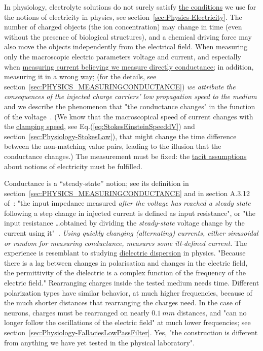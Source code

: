 In physiology, electrolyte solutions do not surely satisfy 
\hyperlink{electric_resistance}{the conditions}
we use for the notions of electricity in physics, see section~\ref{sec:Physics-Electricity}.
The number of charged objects (the ion concentration) may change in
time (even without the presence of biological structures), and a chemical driving force may also move the objects independently
from the electrical field. When measuring only the macroscopic electric
parameters voltage and current, and especially when 
\hyperlink{electric_conductance}
{measuring current believing we measure
directly conductance;} in addition, measuring it in a wrong way; (for the details, see section~\ref{sec:PHYSICS_MEASURINGCONDUCTANCE}) \emph{we
attribute the consequences of the injected charge carriers' low propagation speed to the
medium} and we describe the phenomenon that "the conductance changes"
in the function of the voltage~\cite{KochVoltageDependentConductance:1999}.
(We know that the macroscopical speed of current changes with the \hyperlink{voltage-clamping}{clamping speed}, see Eq.(\ref{eq:StokesEinsteinSpeeddV}) and section~\ref{sec:Physiology-StokesLaw}),
that might change the time difference between the non-matching value pairs, leading to the illusion that the conductance changes.)
The measurement must be fixed:  the 
\hyperlink{electric_resistance}
{tacit assumptions} about notions of electricity must be fulfilled. 



Conductance is a ``steady-state''
notion; see its definition in section~\ref{sec:PHYSICS_MEASURINGCONDUCTANCE} and in section A.3.12 of~\cite{JohnstonWuNeurophysiology:1995}:
"the input impedance measured \emph{after the voltage has reached
	a steady state} following a step change in injected current is defined
as input resistance", or "the input resistance \dots obtained
by dividing the \emph{steady-state} voltage change by the current
using it"~\cite{KochBiophysics:1999}.  \textit{Using quickly changing (alternating) currents, either sinusoidal or random  for measuring conductance, measures some ill-defined current.}
The experience is resemblant to studying \href{https://en.wikipedia.org/wiki/Dielectric}
{dielectric dispersion} in physics. 
"Because there is a lag between changes in polarisation and changes in the electric field, the permittivity of the dielectric is a complex function of the frequency of the electric field." 
Rearranging charges inside the tested medium needs time. 
Different polarization types have similar behavior, at much higher frequencies, because of the much shorter distances that rearranging the charges need.
In the case of neurons, charges must be rearranged on nearly $0.1~mm$ distances, and "can no longer follow the oscillations of the electric field" at  much lower frequencies; see section~\ref{sec:Physiology-FallaciesLowPassFilter}.
Yes, "the construction is different from anything we have yet tested in the physical laboratory".


